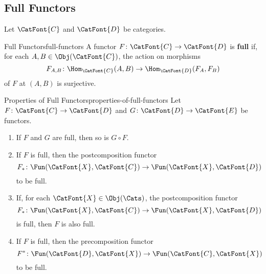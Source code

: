 \subsection{Full Functors}\label{subsection-full-functors}
Let $\CatFont{C}$ and $\CatFont{D}$ be categories.
\begin{definition}{Full Functors}{full-functors}%
    A functor $F\colon\CatFont{C}\to\CatFont{D}$ is \textbf{full} if, for each $A,B\in\Obj(\CatFont{C})$, the action on morphisms
    \[
        F_{A,B}
        \colon
        \Hom_{\CatFont{C}}(A,B)
        \to
        \Hom_{\CatFont{D}}(F_{A},F_{B})
    \]%
    of $F$ at $(A,B)$ is surjective.
\end{definition}
\begin{proposition}{Properties of Full Functors}{properties-of-full-functors}%
    Let $F\colon\CatFont{C}\to\CatFont{D}$ and $G\colon\CatFont{D}\to\CatFont{E}$ be functors.
    \begin{enumerate}
        \item\label{properties-of-full-functors-interaction-with-composition}If $F$ and $G$ are full, then so is $G\circ F$.
        \item\label{properties-of-full-functors-interaction-with-postcomposition-1}If $F$ is full, then the postcomposition functor
            \[
                F_{*}
                \colon
                \Fun(\CatFont{X},\CatFont{C})
                \to
                \Fun(\CatFont{X},\CatFont{D})
            \]%
             to be full.
        \item\label{properties-of-full-functors-interaction-with-postcomposition-2}If, for each $\CatFont{X}\in\Obj(\Cats)$, the postcomposition functor
            \[
                F_{*}
                \colon
                \Fun(\CatFont{X},\CatFont{C})
                \to
                \Fun(\CatFont{X},\CatFont{D})
            \]%
            is full, then $F$ is also full.
        \item\label{properties-of-full-functors-interaction-with-precomposition-1}If $F$ is full, then the precomposition functor
            \[
                F^{*}
                \colon
                \Fun(\CatFont{D},\CatFont{X})
                \to
                \Fun(\CatFont{C},\CatFont{X})
            \]%
             to be full.

\end{enumerate}
\end{proposition}
